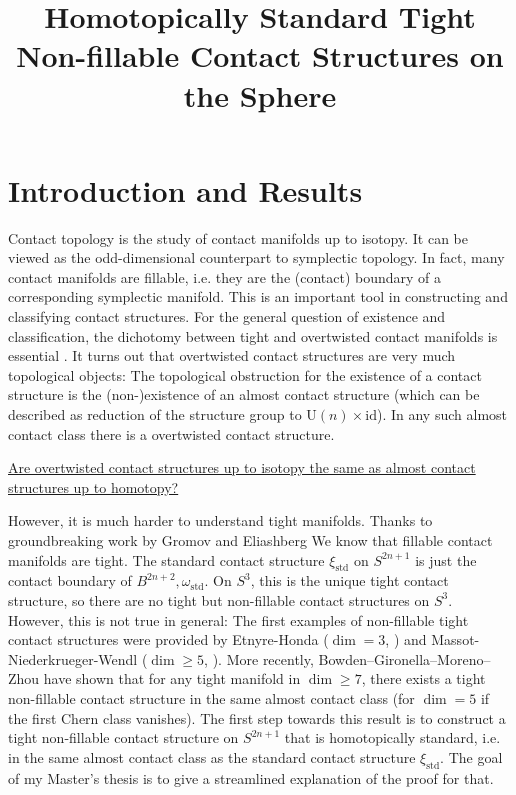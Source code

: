 \documentclass{amsart}
\begin{document}
\title[Homotopically Standard Tight Non-fillable Contact Structures]{Homotopically Standard Tight Non-fillable Contact Structures on the Sphere}
\maketitle
\section*{Introduction and Results}
Contact topology is the study of contact manifolds up to isotopy. It can be viewed as the
odd-dimensional counterpart to symplectic topology.
In fact, many contact manifolds are fillable, i.e. they are the (contact) boundary of a 
corresponding symplectic  manifold. This is an important tool in constructing and 
classifying contact structures.
For the general question of existence and classification, the dichotomy between tight and 
overtwisted contact manifolds is essential \cite{Eliashberg89,BEM15}.
It turns out that overtwisted contact structures are very much topological objects:
The topological obstruction for the existence of a contact structure is the (non-)existence of
an almost contact structure (which can be described as reduction of the structure group to 
$\mathrm U(n) \times \mathrm{id}$). 
In any such almost contact class there is a overtwisted contact structure.

\underline{Are overtwisted contact structures up to isotopy the same as 
almost contact structures up to homotopy?}

However, it is much harder to understand tight manifolds.
Thanks to groundbreaking work by Gromov and Eliashberg \cite{Gromov85,Eliashberg91} 
We know that fillable contact manifolds are tight. The standard contact structure 
$\xi_\mathrm{std}$ on $S^{2n+1}$ is just the contact boundary of $B^{2n+2}, \omega_\mathrm{std}$.
On $S^3$, this is the unique tight contact structure, so there are no tight but non-fillable 
contact structures on $S^3$. However, this is not true in general:
The first examples of non-fillable tight contact structures were provided by
Etnyre-Honda ($\dim = 3$, \cite{EH02}) and Massot-Niederkrueger-Wendl ($\dim \ge 5$, \cite{MNW13}).
More recently, Bowden--Gironella--Moreno--Zhou \cite{BGMZ22} have shown that for any
tight manifold in $\dim \ge 7$, there exists a tight non-fillable contact structure in
the same almost contact class (for $\dim = 5$ if the first Chern class vanishes). 
The first step towards this result is to construct a tight non-fillable contact structure
on $S^{2n+1}$ that is homotopically standard, i.e. in the same almost contact class
as the standard contact structure $\xi_\mathrm{std}$.
The goal of my Master's thesis is to give a streamlined explanation of the proof for that.
\end{document}
